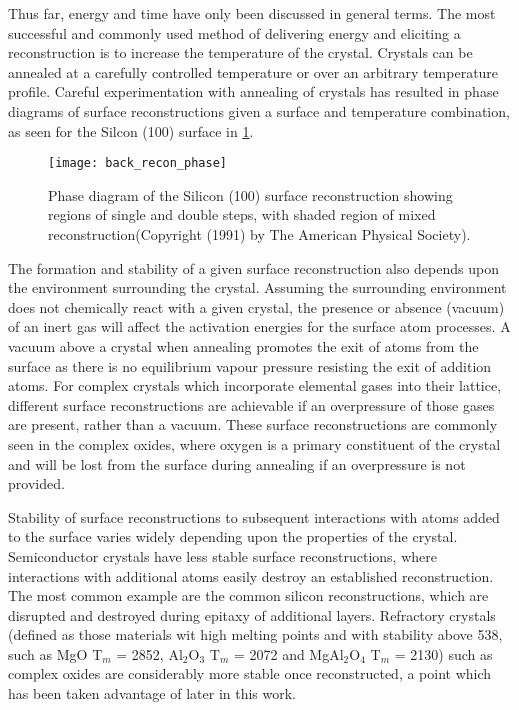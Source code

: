 Thus far, energy and time have only been discussed in general terms.
The most successful and commonly used method of delivering energy and eliciting a reconstruction is to increase the temperature of the crystal.
Crystals can be annealed at a carefully controlled temperature or over an arbitrary temperature profile.
Careful experimentation with annealing of crystals has resulted in phase diagrams of surface reconstructions given a surface and temperature combination, as seen for the Silcon (100) surface in \cref{fig:back_recon_phase}.
\begin{figure}
 \centering \texttt{[image: back\_recon\_phase]}
 \caption[Silicon surface reconstruction phase diagram]{\label{fig:back_recon_phase}Phase diagram of the Silicon (100) surface reconstruction showing regions of single and double steps, with shaded region of mixed reconstruction\cite{Pehlke1991}(Copyright (1991) by The American Physical Society).}
\end{figure}

The formation and stability of a given surface reconstruction also depends upon the environment surrounding the crystal.
Assuming the surrounding environment does not chemically react with a given crystal, the presence or absence (vacuum) of an inert gas will affect the activation energies for the surface atom processes.
A vacuum above a crystal when annealing promotes the exit of atoms from the surface as there is no equilibrium vapour pressure resisting the exit of addition atoms.
For complex crystals which incorporate elemental gases into their lattice, different surface reconstructions are achievable if an overpressure of those gases are present, rather than a vacuum.
These surface reconstructions are commonly seen in the complex oxides, where oxygen is a primary constituent of the crystal and will be lost from the surface during annealing if an overpressure is not provided.

Stability of surface reconstructions to subsequent interactions with atoms added to the surface varies widely depending upon the properties of the crystal.
Semiconductor crystals have less stable surface reconstructions, where interactions with additional atoms easily destroy an established reconstruction.
The most common example are the common silicon reconstructions, which are disrupted and destroyed during epitaxy of additional layers.
Refractory crystals (defined as those materials wit high melting points and with stability above 538\celsius{}\cite{ASTMC71}, such as MgO T\(_m\) = 2852\celsius{}, Al\(_2\)O\(_3\) T\(_m\) = 2072\celsius{} and MgAl\(_2\)O\(_4\) T\(_m\) = 2130\celsius{}) such as complex oxides are considerably more stable once reconstructed, a point which has been taken advantage of later in this work.

